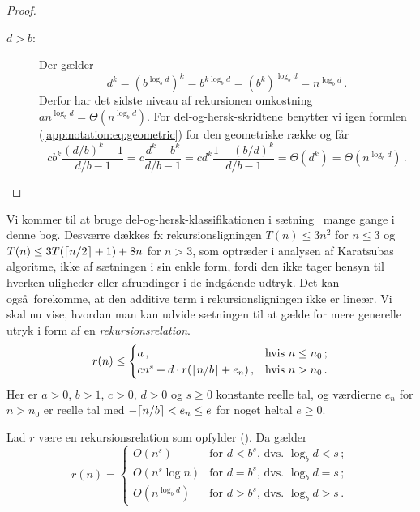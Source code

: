 \begin{proof}
\begin{description}
\item[$d>b$:] Der gælder
  \[ d^k
  =(b^{\log_b d})^k
  =b^{k\log_b d}
  =(b^k)^{\log_b d}
  =n^{\log_b d}\,. \]
  Derfor har det sidste niveau af rekursionen omkostning $an^{\log_b d}=\Theta(n^{\log_b d})$.
      For del-og-hersk-skridtene benytter vi igen formlen (\ref{app:notation:eq:geometric}) for den geometriske række og får 
  \begin{equation}
    cb^k\frac{(d/b)^k-1}{d/b-1} =
    c\frac{d^k-b^k}{d/b-1} =
    cd^k\frac{1-(b/d)^k}{d/b-1} =
    \Theta(d^k) =
    \Theta(n^{\log_b d})\,. 
  \end{equation}
  \end{description}
\end{proof}

Vi kommer til at bruge del-og-hersk-klassifikationen i sætning~ mange gange i denne bog.
Desværre dækkes fx rekursionsligningen $T(n) \le 3n^2$ for $n \le 3$ og  $T(n) \le 3T(\lceil n/2\rceil + 1) + 8n$ for $n>3$, som optræder i analysen af Karatsubas algoritme, ikke af sætningen i sin enkle form, fordi den ikke tager hensyn til hverken uligheder eller afrundinger i de indgående udtryk.
Det kan også forekomme, at den additive term i rekursionsligningen ikke er lineær.
Vi skal nu vise, hvordan man kan udvide sætningen til at gælde for mere generelle utryk i form af en 
\emph{rekursionsrelation}.
%
\begin{equation}
  \llabel{eq:1000}
  r(n)\leq
  \begin{cases}
    a\,, & \text{hvis }n\leq n_0\,;\\
    cn^s + d \cdot r(\ceil{n/b} + e_n)\,, & \text{hvis } n > n_0\,.
  \end{cases}
\end{equation} 
Her er $a>0$, $b>1$, $c>0$, $d>0$ og $s\ge 0$ konstante reelle tal, og  værdierne $e_n$ for $n>n_0$ er reelle tal med $-\lceil n/b\rceil < e_n \le e$ for noget heltal $e\ge0$.
%
\addtocounter{theorem}{-1}
\begin{thm}
  Lad $r$ være en rekursionsrelation som opfylder ().
  Da gælder
\[ r(n)=
\begin{cases}
O(n^s) & \text{for $d < b^s$, dvs. $\log_b d < s$}\,;\\
O(n^s\log n) & \text{for $d = b^s$, dvs. $\log_b d = s$}\,;\\
  O(n^{\log_bd}) & \text{for $d > b^s$, dvs. $\log_b d > s$}\,.
\end{cases} \]
\end{thm}


